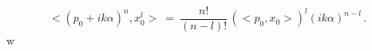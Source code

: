 \begin{equation}< (p_0 + ik\alpha)^n , x_0^l > \ = \
\frac{n!}{(n-l)!}\,(<p_0 , x_0>)^l (ik\alpha)^{n-l}\, .\label{433}
\end{equation}w
